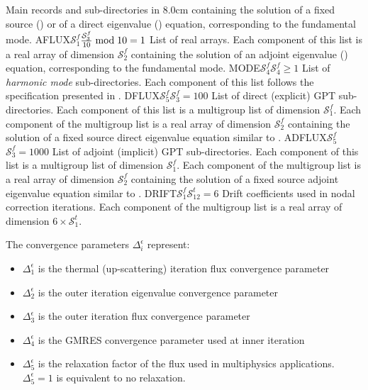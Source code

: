 \begin{DescriptionEnregistrement}{Main records and sub-directories in }{8.0cm}
{  containing the solution of a fixed source () or of a direct eigenvalue () equation,
  corresponding to the fundamental mode.}
\OptDirlEnr
  {AFLUX}{$\mathcal{S}^{f}_{1}$}{${\mathcal{S}^{f}_{3}\over 10} \bmod 10 = 1$}
  {List of real arrays. Each component of this list is a real array of dimension $\mathcal{S}^{f}_{2}$
  containing the solution of an adjoint eigenvalue () equation,
  corresponding to the fundamental mode.}
\OptDirlEnr
  {MODE}{$\mathcal{S}^{f}_{4}$}{$\mathcal{S}^{f}_{4}\ge 1$}
  {List of {\sl harmonic mode} sub-directories. Each component of this list follows
  the specification presented in .}
\OptDirlEnr
  {DFLUX}{$\mathcal{S}^{f}_{5}$}{$\mathcal{S}^{f}_{3}=100$}
  {List of direct (explicit) GPT sub-directories. Each component of this list is a multigroup list of
  dimension $\mathcal{S}^{f}_{1}$. Each component of the multigroup list is a real array of dimension
  $\mathcal{S}^{f}_{2}$ containing the solution of a fixed source direct eigenvalue equation similar to .}
\OptDirlEnr
  {ADFLUX}{$\mathcal{S}^{f}_{5}$}{$\mathcal{S}^{f}_{3}=1000$}
  {List of adjoint (implicit) GPT sub-directories. Each component of this list is a multigroup list of
  dimension $\mathcal{S}^{f}_{1}$. Each component of the multigroup list is a real array of dimension
  $\mathcal{S}^{f}_{2}$ containing the solution of a fixed source adjoint eigenvalue equation similar to .}
\OptDirlEnr
  {DRIFT}{$\mathcal{S}^{f}_{1}$}{$\mathcal{S}^{t}_{12}=6$}
  {Drift coefficients used in nodal correction iterations. Each component of the multigroup list is a real array of dimension
  $6\times \mathcal{S}^{t}_{1}$.}
\end{DescriptionEnregistrement}

The convergence parameters $\Delta_i^\epsilon$ represent:
\begin{itemize}
\item $\Delta_1^\epsilon$ is the thermal (up-scattering) iteration flux convergence parameter
\item $\Delta_2^\epsilon$ is the outer iteration eigenvalue convergence parameter
\item $\Delta_3^\epsilon$ is the outer iteration flux convergence parameter
\item $\Delta_4^\epsilon$ is the GMRES convergence parameter used at inner iteration
\item $\Delta_5^\epsilon$ is the relaxation factor of the flux used in multiphysics applications. $\Delta_5^\epsilon=1$ is equivalent to no
relaxation.
\end{itemize}
\goodbreak

